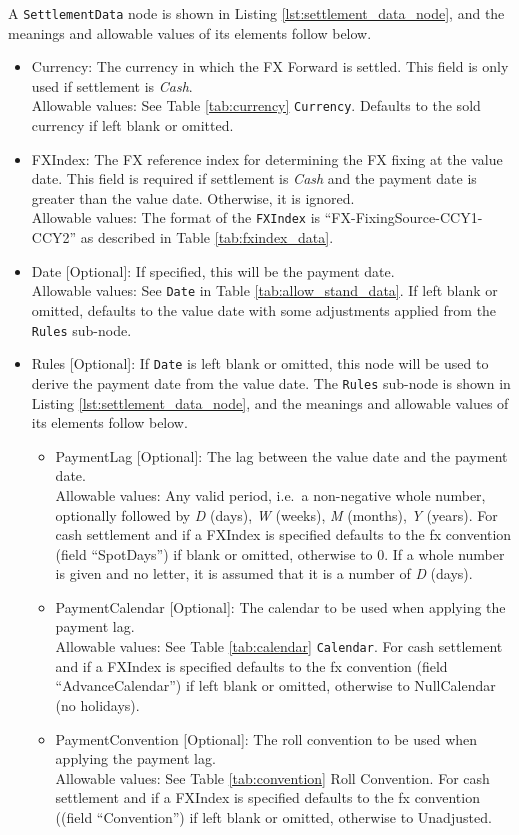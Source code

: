 A \lstinline!SettlementData! node is shown in Listing \ref{lst:settlement_data_node}, and the meanings and allowable values of its elements follow below.

\begin{itemize}
\item Currency: The currency in which the FX Forward is settled. This field is only used if settlement is \emph{Cash}. \\
Allowable values:  See Table \ref{tab:currency} \lstinline!Currency!. Defaults to the sold currency if left blank or omitted.
\item FXIndex: The FX reference index for determining the FX fixing at the value date. This field is required if settlement is \emph{Cash}
and the payment date is greater than the value date. Otherwise, it is ignored. \\
Allowable values: The format of the \lstinline!FXIndex! is ``FX-FixingSource-CCY1-CCY2'' as described in Table \ref{tab:fxindex_data}.
\item Date [Optional]: If specified, this will be the payment date. \\
Allowable values: See \lstinline!Date! in Table \ref{tab:allow_stand_data}. If left blank or omitted, defaults to the value date with some adjustments applied
from the \lstinline!Rules! sub-node.
\item Rules [Optional]: If \lstinline!Date! is left blank or omitted, this node will be used to derive the payment date from the value date.
The \lstinline!Rules! sub-node is shown in Listing \ref{lst:settlement_data_node}, and the meanings and allowable values of its elements follow below.
  \begin{itemize}
	\item PaymentLag [Optional]: The lag between the value date and the payment date. \\
	Allowable values: Any valid period, i.e.\ a non-negative whole number, optionally followed by \emph{D} (days), \emph{W} (weeks), \emph{M} (months),
  \emph{Y} (years). For cash settlement and if a FXIndex is specified defaults to the fx convention (field ``SpotDays'') if blank or omitted, otherwise to 0. If a whole number is given and no letter, it is assumed that it is a number of  \emph{D} (days).
	\item PaymentCalendar [Optional]: The calendar to be used when applying the payment lag. \\
	Allowable values: See Table \ref{tab:calendar} \lstinline!Calendar!. For cash settlement and if a FXIndex is specified defaults to the fx convention (field ``AdvanceCalendar'') if left blank or omitted, otherwise to NullCalendar (no holidays).
	\item PaymentConvention [Optional]: The roll convention to be used when applying the payment lag. \\
	Allowable values: See Table \ref{tab:convention} Roll Convention. For cash settlement and if a FXIndex is specified defaults to the fx convention ((field ``Convention'') if left blank or omitted, otherwise to Unadjusted.
  \end{itemize}
\end{itemize}

